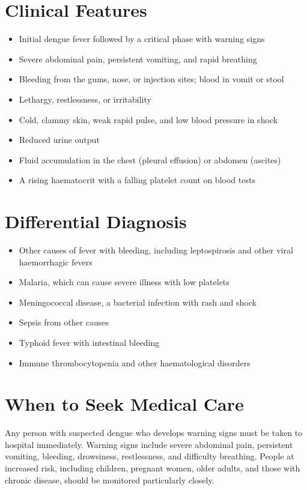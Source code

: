 \section*{Clinical Features}
\begin{itemize}
    \item Initial dengue fever followed by a critical phase with warning signs
    \item Severe abdominal pain, persistent vomiting, and rapid breathing
    \item Bleeding from the gums, nose, or injection sites; blood in vomit or stool
    \item Lethargy, restlessness, or irritability
    \item Cold, clammy skin, weak rapid pulse, and low blood pressure in shock
    \item Reduced urine output
    \item Fluid accumulation in the chest (pleural effusion) or abdomen (ascites)
    \item A rising haematocrit with a falling platelet count on blood tests
\end{itemize}

\section*{Differential Diagnosis}
\begin{itemize}
    \item Other causes of fever with bleeding, including leptospirosis and other viral haemorrhagic fevers
    \item Malaria, which can cause severe illness with low platelets
    \item Meningococcal disease, a bacterial infection with rash and shock
    \item Sepsis from other causes
    \item Typhoid fever with intestinal bleeding
    \item Immune thrombocytopenia and other haematological disorders
\end{itemize}

\section*{When to Seek Medical Care}
Any person with suspected dengue who develops warning signs must be taken to hospital immediately. Warning signs include severe abdominal pain, persistent vomiting, bleeding, drowsiness, restlessness, and difficulty breathing. People at increased risk, including children, pregnant women, older adults, and those with chronic disease, should be monitored particularly closely.

